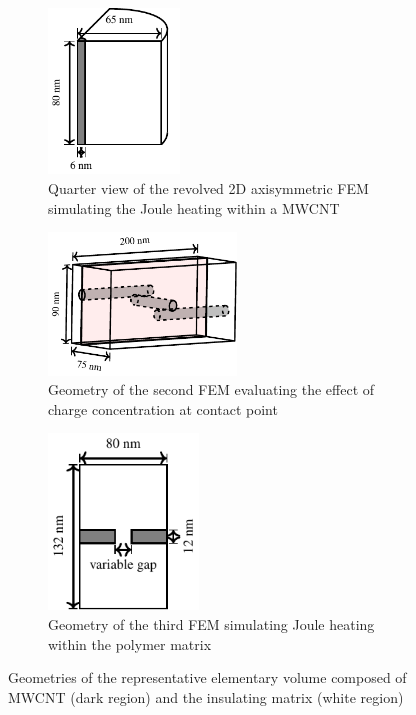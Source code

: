 \documentclass[11pt,review,times]{elsarticle}
\begin{document}
\begin{figure}[htb]
	\center
	\begin{subfigure}{40mm}
		\center
		\captionsetup{width=35mm}
		\includegraphics[width=35mm]{geometry_axisymmetric}
		\caption{Quarter view of the revolved 2D axisymmetric FEM simulating the Joule heating within a MWCNT}
		\label{fig:geometry_axisymmetric}
	\end{subfigure}%
	\begin{subfigure}{55mm}
		\center
		\captionsetup{width=50mm}
		\includegraphics[width=50mm]{geometry_3D}
		\caption{Geometry of the second FEM evaluating the effect of charge concentration at contact point}
		\label{fig:geometry_3D}
	\end{subfigure}
	\begin{subfigure}{40mm}
		\center
		\captionsetup{width=40mm}
		\includegraphics[width=40mm]{geometry_gap}
		\caption{Geometry of the third FEM simulating Joule heating within the polymer matrix}
		\label{fig:geometry_gap}
	\end{subfigure} 
	\caption{Geometries of the representative elementary volume composed of MWCNT (dark region) and the insulating matrix (white region) \cite{Brassard2018_REV}}
	\label{fig:geometry}
\end{figure}
\end{document}
